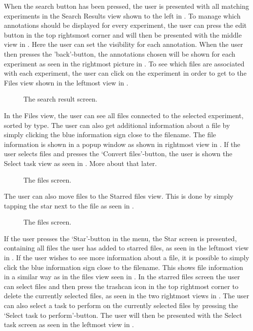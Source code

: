 When the search button has been pressed, the user is presented with all matching experiments in the Search Results view shown to the left in . To manage which annotations should be displayed for every experiment, the user can press the edit button in the top rightsmost corner and will then be presented with the middle view in . Here the user can set the visibility for each annotation. When the user then presses the ’back’-button, the annotations chosen will be shown for each experiment as seen in the rightmost picture in . To see which files are associated with each experiment, the user can click on the experiment in order to get to the Files view shown in the leftmost view in .

\begin{figure}[ht]
\caption{The search result screen.}
\label{fig:ios_searchResult}
\end{figure}
\FloatBarrier
In the Files view, the user can see all files connected to the selected experiment, sorted by type. The user can also get additional information about a file by simply clicking the blue information sign close to the filename. The file information is shown in a popup window as shown in rightmost view in . If the user selects files and presses the ‘Convert files’-button, the user is shown the Select task view as seen in . More about that later.

\begin{figure}[htb]
\caption{The files screen.}
\label{fig:ios_files1}
\end{figure}
\FloatBarrier
The user can also move files to the Starred files view. This is done by simply tapping the star next to the file as seen in .

\begin{figure}[htb]
\caption{The files screen.}
\label{fig:ios_files3}
\end{figure}
\FloatBarrier
If the user presses the ‘Star’-button in the menu, the Star screen is presented, containing all files the user has added to starred files, as seen in the leftmost view in . If the user wishes to see more information about a file, it is possible to simply click the blue information sign close to the filename. This shows file information in a similar way as in the files view seen in . In the starred files screen the user can select files and then press the trashcan icon in the top rightmost corner to delete the currently selected files, as seen in the two rightmost views in . The user can also select a task to perform on the currently selected files by pressing the ‘Select task to perform’-button. The user will then be presented with the Select task screen as seen in the leftmost view in .

